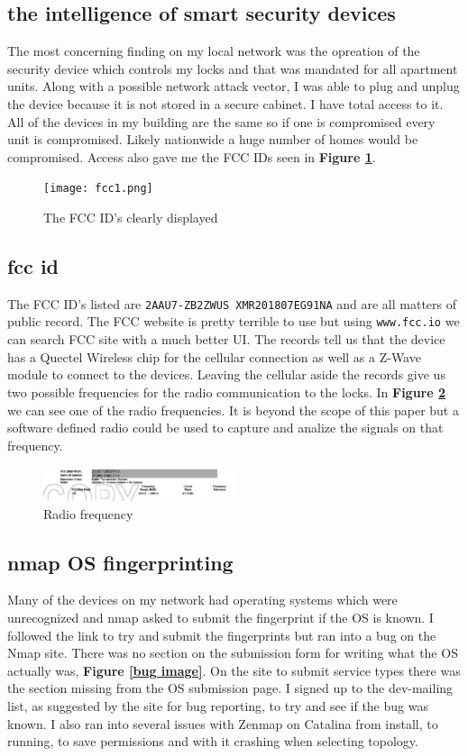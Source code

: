 \documentclass[10pt]{article}
\begin{document}
\subsection*{the intelligence of smart security devices}
The most concerning finding on my local network was the opreation of the security device which controls my locks and that was mandated for all 
apartment units. Along with a possible network attack vector, I was able to plug and unplug the device because it is not stored in a secure cabinet. I have total 
access to it. All of the devices in my building are the same so if one is compromised every unit is compromised. Likely nationwide a huge number of homes would be 
compromised. Access also gave me the FCC IDs seen in \textbf{Figure \ref{fcc1 image}}.
\begin{figure}[H]
\centering
\texttt{[image: fcc1.png]}
\caption{The FCC ID's clearly displayed}\label{fcc1 image}
\end{figure}

\subsection*{fcc id}
The FCC ID's listed are \verb|2AAU7-ZB2ZWUS XMR201807EG91NA| and are all matters of public record. The FCC website is pretty terrible to use but using
\verb|www.fcc.io| we can search FCC site with a much better UI. The records tell us that the device has a Quectel Wireless chip for the cellular connection
as well as a Z-Wave module to connect to the devices.\cite{fcc} Leaving the cellular aside the records give us two possible frequencies for the radio communication
to the locks. In \textbf{Figure \ref{radio image}} we can see one of the radio frequencies.\cite{fcc} It is beyond the scope of this paper but a software 
defined radio could be used to capture and analize the signals on that frequency.

\begin{figure}[H]
\centering
\includegraphics[width=0.5\textwidth]{radio.png}
\caption{Radio frequency}\label{radio image}
\end{figure}

\subsection*{nmap OS fingerprinting}
Many of the devices on my network had operating systems which were unrecognized and nmap asked to submit the fingerprint if the OS is known. I followed the link to try 
and submit the fingerprints but ran into a bug on the Nmap site. There was no section on the submission form for writing what the OS actually was, \textbf{Figure \ref{bug image}}. 
On the site to submit service types there was the section missing from the OS submission page. I signed up to the dev-mailing list, as suggested by the site for bug 
reporting, to try and see if the bug was known.\cite{submit} I also ran into several issues with Zenmap on Catalina from install, to running, to save permissions and with it 
crashing when selecting topology.
\end{document}
